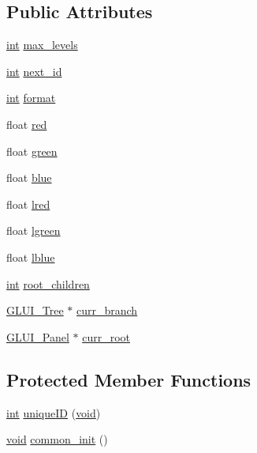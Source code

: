 \subsection*{Public Attributes}
\begin{DoxyCompactItemize}
\item 
\hyperlink{wglext_8h_a500a82aecba06f4550f6849b8099ca21}{int} \hyperlink{class_g_l_u_i___tree_panel_ae81b65ebfa05b2df296aea0a57e752dc}{max\+\_\+levels}
\item 
\hyperlink{wglext_8h_a500a82aecba06f4550f6849b8099ca21}{int} \hyperlink{class_g_l_u_i___tree_panel_a85bd58ffca6906bd0b6ff2e324ba70eb}{next\+\_\+id}
\item 
\hyperlink{wglext_8h_a500a82aecba06f4550f6849b8099ca21}{int} \hyperlink{class_g_l_u_i___tree_panel_aeb2d6a31b0bb0d9a6a2107513b3c51ed}{format}
\item 
float \hyperlink{class_g_l_u_i___tree_panel_a39d13ee9c5ffe021b141bca6c671bfd2}{red}
\item 
float \hyperlink{class_g_l_u_i___tree_panel_a060d47ab1bbc29e9e374b9fde4d0bb24}{green}
\item 
float \hyperlink{class_g_l_u_i___tree_panel_ad8ebcaedd75a2a360733756fec26c9ab}{blue}
\item 
float \hyperlink{class_g_l_u_i___tree_panel_ad579d2005dc7a5393e79640db17d5cee}{lred}
\item 
float \hyperlink{class_g_l_u_i___tree_panel_a7c0549d23a93ddc096b9993d75738293}{lgreen}
\item 
float \hyperlink{class_g_l_u_i___tree_panel_a98990c5c9b532c3852471cc128ba4879}{lblue}
\item 
\hyperlink{wglext_8h_a500a82aecba06f4550f6849b8099ca21}{int} \hyperlink{class_g_l_u_i___tree_panel_af8a2ba6a77b418ae7f1c77a13369ee80}{root\+\_\+children}
\item 
\hyperlink{class_g_l_u_i___tree}{G\+L\+U\+I\+\_\+\+Tree} $\ast$ \hyperlink{class_g_l_u_i___tree_panel_a7a62e833115d3c32540406f170de4455}{curr\+\_\+branch}
\item 
\hyperlink{class_g_l_u_i___panel}{G\+L\+U\+I\+\_\+\+Panel} $\ast$ \hyperlink{class_g_l_u_i___tree_panel_a380028a250b33f34afd7e10759813356}{curr\+\_\+root}
\end{DoxyCompactItemize}
\subsection*{Protected Member Functions}
\begin{DoxyCompactItemize}
\item 
\hyperlink{wglext_8h_a500a82aecba06f4550f6849b8099ca21}{int} \hyperlink{class_g_l_u_i___tree_panel_aeb4b329f0f779c8f289c3efdb9ecd258}{unique\+I\+D} (\hyperlink{wglext_8h_a9e6b7f1933461ef318bb000d6bd13b83}{void})
\item 
\hyperlink{wglext_8h_a9e6b7f1933461ef318bb000d6bd13b83}{void} \hyperlink{class_g_l_u_i___tree_panel_a0584049c802c2074a86367053b2d2e20}{common\+\_\+init} ()
\end{DoxyCompactItemize}

